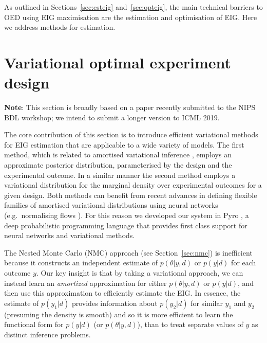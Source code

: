 As outlined in Sections~\ref{sec:esteig} and~\ref{sec:opteig}, the main technical barriers to OED using EIG maximisation are the estimation and optimisation of EIG. Here we address methods for estimation.

\section{Variational optimal experiment design}
\textbf{Note}: This section is broadly based on a paper recently submitted to the NIPS BDL workshop; we intend to submit a longer version to ICML 2019.
\bigskip

The core contribution of this section is to introduce efficient variational methods for EIG estimation that are applicable to a wide variety of models.
The first method, which is related to amortised variational inference \cite{dayan1995helmholtz,kingma2014auto,paige2016inference,rezende2014stochastic,stuhlmuller2013learning}, employs an approximate posterior distribution, parameterised by the design and the experimental outcome. In a similar manner the second method employs a variational distribution for the marginal density over experimental outcomes for a given design. 
Both methods can benefit from recent advances in defining flexible families of amortised variational distributions 
using neural networks (e.g.~normalising flows \cite{rezende2015variational,tabak2013family}). For this reason we developed our system in Pyro \cite{pyro}, a deep probabilistic programming language that provides first class support for neural networks and variational methods.  

The Nested Monte Carlo (NMC) approach (see Section~\ref{sec:nmc}) is inefficient because it constructs an independent estimate of $p(\theta | y, d)$ or $p(y|d)$ for each outcome $y$.
Our key insight is that by taking a variational approach, we can instead learn an \emph{amortized} approximation
for either $p(\theta|y,d)$ or $p(y|d)$, and then use this approximation to efficiently estimate the EIG.  In
essence, the estimate of $p(y_1|d)$ provides information about $p(y_2|d)$ for similar $y_1$ and $y_2$ (presuming
the density is smooth) and so it is more efficient to learn the functional form for $p(y|d)$ (or $p(\theta|y,d)$),
than to treat separate values of $y$ as distinct inference problems.


